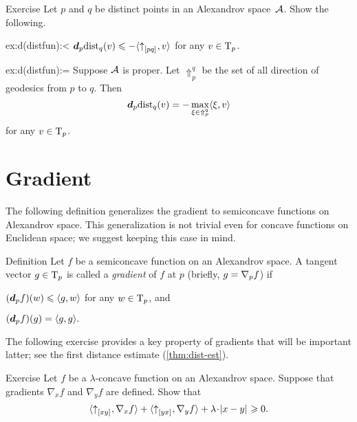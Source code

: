 \begin{thm}{Exercise}\label{ex:d(distfun)}
Let $p$ and $q$ be distinct points in an Alexandrov space~$\mathcal{A}$.
Show the following.

\begin{subthm}{ex:d(distfun):<}
$\bm{d}_p\mathrm{dist}_q(v)\leqslant -\langle{\uparrow}_{[{p}{q}]_{{}}},v\rangle$
for any $v\in\mathrm{T}_p$.
\end{subthm}

\begin{subthm}{ex:d(distfun):=}
Suppose $\mathcal{A}$ is proper.
Let $\Uparrow_p^q$ be the set of all direction of  geodesics from $p$ to $q$.
Then
\[\bm{d}_p\mathrm{dist}_q(v)=-\max_{\xi\in\Uparrow_p^q}\langle\xi,v\rangle\]
for any $v\in\mathrm{T}_p$.
\end{subthm}

\end{thm}

\section{Gradient}\label{sec:grad-def}

The following definition generalizes the gradient to semiconcave functions on Alexandrov space.
This generalization is not trivial even for concave functions on Euclidean space;
we suggest keeping this case in mind.

\begin{thm}{Definition}\label{def:grad} 
Let $f$ be a semiconcave function on an Alexandrov space.
A tangent vector $g\in \mathrm{T}_p$ is called a 
\emph{gradient} of $f$ at $p$ 
(briefly,  $g=\nabla_p f$) if
\begin{subthm}{}
$(\bm{d}_p f)(w)\leqslant \langle g,w\rangle$ for any $w\in \mathrm{T}_p$, and
\end{subthm}

\begin{subthm}{}
$(\bm{d}_p f)(g) = \langle g,g\rangle.$
\end{subthm}
\end{thm}

The following exercise provides a key property of gradients that will be important latter;
see the first distance estimate (\ref{thm:dist-est}).

\begin{thm}{Exercise}\label{ex:monotonicity}
Let $f$ be a $\lambda$-concave function on an Alexandrov space.
Suppose that gradients $\nabla_xf$ and $\nabla_yf$ are defined.
Show that 
\[\<\dir{x}{y},\nabla_{x}f\>
+
\<\dir{y}{x},\nabla_{y}f\>
+
\lambda\cdot\dist{x}{y}{}\ge 0.\]
\end{thm}

